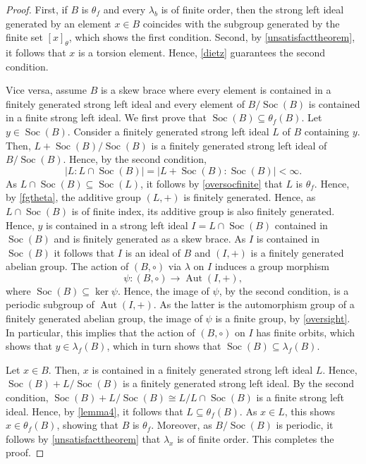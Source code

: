 \documentclass{amsart}
\newcommand{\Aut}{\operatorname{Aut}}
\newcommand{\Soc}{\operatorname{Soc}}
\begin{document}
\begin{proof}
    First, if $B$ is $\theta_f$ and every $\lambda_b$ is of finite order, then the strong left ideal generated by an element $x \in B$ coincides with the subgroup generated by the finite set $[x]_{\theta}$, which shows the first condition. Second, by \cref{unsatisfacttheorem}, it follows that $x$ is a torsion element. Hence, \cref{dietz} guarantees the second condition.

    Vice versa, assume $B$ is a skew brace where every element is contained in a finitely generated strong left ideal and every element of $B/\Soc(B)$ is contained in a finite strong left ideal. We first prove that $\Soc(B) \subseteq \theta_f(B)$. Let $y \in \Soc(B)$. Consider a finitely generated strong left ideal $L$ of $B$ containing $y$. Then, $L+\Soc(B)/\Soc(B)$ is a finitely generated strong left ideal of $B/\Soc(B)$. Hence, by the second condition, $$ |L: L \cap \Soc(B)| =| L+\Soc(B) : \Soc(B) | <\infty.$$ As $ L \cap \Soc(B)\subseteq \Soc(L)$, it follows by \cref{oversocfinite} that $L$ is $\theta_f$. Hence, by \cref{fgtheta}, the additive group $(L,+)$ is finitely generated. Hence, as $L\cap \Soc(B)$ is of finite index, its additive group is also finitely generated. Hence, $y$ is contained in a strong left ideal $I=L\cap \Soc(B)$ contained in $\Soc(B)$ and is finitely generated as a skew brace. As $I$ is contained in $\Soc(B)$ it follows that $I$ is an ideal of $B$ and $(I,+)$ is a finitely generated abelian group. The action of $(B,\circ)$ via $\lambda$ on $I$ induces a group morphism $$ \psi : (B,\circ) \rightarrow \Aut(I,+),$$ where $\Soc(B) \subseteq \ker \psi$. Hence, the image of $\psi$, by the second condition, is a periodic subgroup of $\Aut(I,+)$. As the latter is the automorphism group of a finitely generated abelian group, the image of $\psi$ is a finite group, by \cref{oversight}. In particular, this implies that the action of $(B,\circ)$ on $I$ has finite orbits, which shows that $y \in \lambda_f(B)$, which in turn shows that $\Soc(B) \subseteq \lambda_f(B)$.
    
    Let $x \in B$. Then, $x$ is contained in a finitely generated strong left ideal $L$. Hence, $\Soc(B) + L/\Soc(B)$ is a finitely generated strong left ideal. By the second condition, $\Soc(B) +L / \Soc(B) \cong L /L\cap \Soc(B)$ is a finite strong left ideal. Hence, by \cref{lemma4}, it follows that $L \subseteq \theta_f(B)$. As $x \in L$, this shows $x \in \theta_f(B)$, showing that $B$ is $\theta_f$. Moreover, as $B / \Soc(B)$ is periodic, it follows by \cref{unsatisfacttheorem} that $\lambda_x$ is of finite order. This completes the proof.
\end{proof}
\end{document}
